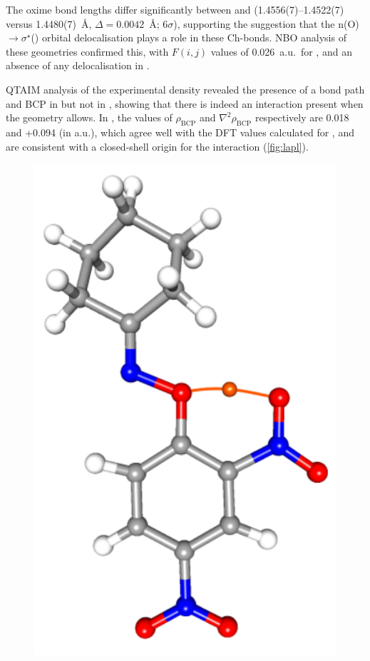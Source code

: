 \begin{refsection}
The oxime bond lengths differ significantly between  and  (1.4556(7)--1.4522(7) versus 1.4480(7)~\AA, $\Delta = 0.0042$~\AA{}; 6$\sigma$), supporting the suggestion that the n(O)$\rightarrow \sigma^{\star}$() orbital delocalisation plays a role in these Ch-bonds.
NBO analysis of these geometries confirmed this, with $F(i,j)$ values of 0.026~a.u.\ for , and an absence of any delocalisation in .

QTAIM analysis of the experimental density revealed the presence of a bond path and BCP in  but not in , showing that there is indeed an interaction present when the geometry allows.
In , the values of $\rho_\text{BCP}$ and $\nabla^{2}\rho_\text{BCP}$ respectively are 0.018 and +0.094 (in a.u.), which agree well with the DFT values calculated for , and are consistent with a closed-shell origin for the interaction (\cref{fig:lapl}).

\begin{figure}
	\centering
	\includegraphics[width=0.3\columnwidth]{Figures/cyclohexanone-oxime-dnp-bcp.pdf}


\end{figure}
\end{refsection}
